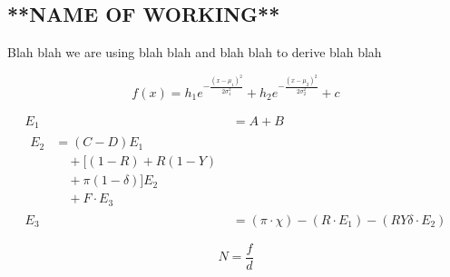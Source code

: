 \documentclass[]{article}
\begin{document}
        \subsection{**NAME OF WORKING**}

            Blah blah we are using blah blah and blah blah to derive blah blah

            \begin{equation}
                f(x)=h_1 e^{-\frac{(x-\mu_1)^2}{2\sigma_1^2}}+h_2 e^{-\frac{(x-\mu_2)^2}{2\sigma_2^2}}+c
                \label{eq:dubGauss}
            \end{equation}


            \begin{align}
                E_1&=A+B \label{eq:1}\\
                 \begin{split}
                  E_2&=(C-D)E_1 \label{eq:2}\\
                  &\quad +[(1-R)+R(1-Y)\\
                  &\quad +\pi(1-\delta)]E_2\\
                  &\quad +F\cdot E_3
                 \end{split}\\
                E_3 &=(\pi\cdot \chi)-(R\cdot E_1)-(RY\delta\cdot E_2) \label{eq:3}
            \end{align}


        
    \begin{multicols}{2}

        
    \end{multicols}



    \begin{equation}
        N=\frac{f}{d}
        \label{eq:fstop}
    \end{equation}

  
    


  \nocite{*}
  
  
\end{document}
